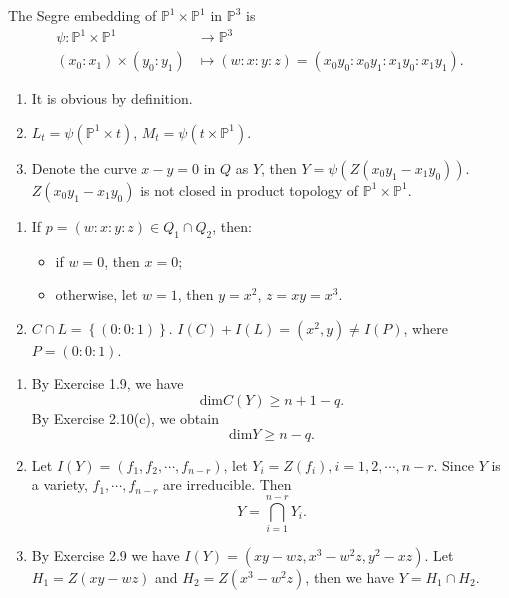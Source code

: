 \begin{solution}
The Segre embedding of $\mathbb{P}^{1}\times \mathbb{P}^{1}$ in $\mathbb{P}^{3}$ is
\begin{align*}
  \psi: \mathbb{P}^{1}\times \mathbb{P}^{1} &\longrightarrow \mathbb{P}^{3} \\
  (x_0:x_1)\times (y_0:y_1) &\longmapsto (w:x:y:z)=(x_0y_0:x_0y_1:x_1y_0:x_1y_1)
.\end{align*}
\begin{enumerate}
  \item It is obvious by definition.
  \item $L_t=\psi\left( \mathbb{P}^{1}\times t \right)  $, $M_t=\psi\left( t\times \mathbb{P}^{1} \right) $.
  \item Denote the curve $x-y=0$ in $Q$ as $Y$, then $Y=\psi \left( Z\left( x_0y_1-x_1y_0 \right)  \right) $. $Z\left( x_0y_1-x_1y_0 \right) $ is not closed in product topology  of  $\mathbb{P}^{1}\times \mathbb{P}^{1}$.
\end{enumerate}
\end{solution}

\begin{solution}
  \begin{enumerate}
    \item If $p=(w:x:y:z)\in Q_1\cap Q_2$, then:
      \begin{itemize}
        \item if $w=0$, then  $x=0$;
	\item otherwise, let  $w=1$, then $y=x^2$, $z=xy=x^3$.
      \end{itemize}
    \item $C\cap L=\left\{\left(0:0:1\right) \right\} $. $I(C)+I(L)=(x^2,y)\neq I(P)$, where $P=(0:0:1)$.
  \end{enumerate}
\end{solution}

\begin{solution}
  \begin{enumerate}
    \item By Exercise 1.9, we have
      \[
	\mathrm{dim}C(Y)\ge n+1-q.
      \] 
      By Exercise 2.10(c), we obtain
      \[
      \mathrm{dim}Y\ge n-q.
      \] 
    \item Let $I(Y)=(f_1,f_2,\cdots ,f_{n-r})$, let $Y_i=Z(f_i),i=1,2,\cdots ,n-r$. Since $Y$ is a variety, $f_1,\cdots ,f_{n-r}$ are irreducible. Then
      \[
      Y=\bigcap_{i=1} ^{n-r}Y_i.
      \]
    \item By Exercise 2.9 we have $I(Y)= \left( xy-wz,x^3-w^2z,y^2-xz \right)  $. Let $H_1=Z(xy-wz)$ and $H_2=Z(x^3-w^2z)$, then we have $Y=H_1\cap H_2$.
  \end{enumerate}
\end{solution}
